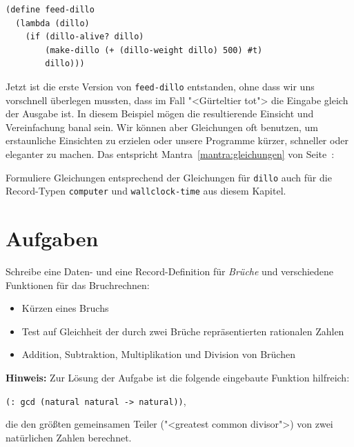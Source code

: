 %
\begin{lstlisting}
(define feed-dillo
  (lambda (dillo)
    (if (dillo-alive? dillo)
        (make-dillo (+ (dillo-weight dillo) 500) #t)
        dillo)))
\end{lstlisting}
%
Jetzt ist die erste Version von \lstinline{feed-dillo} entstanden, ohne
dass wir uns vorschnell überlegen mussten, dass im Fall "<Gürteltier
tot"> die Eingabe gleich der Ausgabe ist.  In diesem Beispiel mögen die
resultierende Einsicht und Vereinfachung banal sein.  Wir können aber
Gleichungen oft benutzen, um erstaunliche Einsichten zu erzielen oder
unsere Programme kürzer, schneller oder eleganter zu machen.  Das
entspricht Mantra~\ref{mantra:gleichungen} von
Seite~\pageref{mantra:gleichungen}:
%
\mantragleichungen*

\begin{aufgabeinline}
  Formuliere Gleichungen entsprechend der Gleichungen für
  \lstinline{dillo} auch für die
  Record-Typen \lstinline{computer} und \lstinline{wallclock-time} aus
  diesem Kapitel.
\end{aufgabeinline}

\section*{Aufgaben}

\begin{aufgabe}
  Schreibe eine Daten- und eine
  Record-Definition für \textit{Brüche} und verschiedene Funktionen
  für das Bruchrechnen:
  \begin{itemize}
  \item Kürzen eines Bruchs
  \item Test auf Gleichheit der durch zwei Brüche repräsentierten
    rationalen Zahlen
  \item Addition, Subtraktion, Multiplikation und Division von
    Brüchen
  \end{itemize}
%
  \textbf{Hinweis:} Zur Lösung der Aufgabe ist die folgende eingebaute
  Funktion hilfreich:
  \begin{center}
    \lstinline{(: gcd (natural natural -> natural))},
  \end{center}
  die den größten gemeinsamen Teiler ("<greatest common divisor">) von
  zwei natürlichen Zahlen berechnet.

\end{aufgabe}

